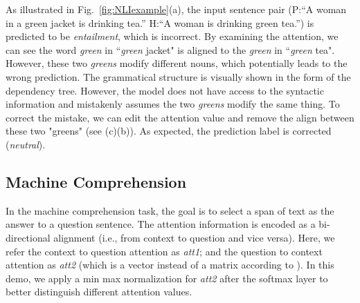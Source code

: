 As illustrated in Fig.~\ref{fig:NLIexample}(a), the input sentence pair (P:``A woman in a green jacket is drinking tea.'' H:``A woman is drinking green tea.'') is predicted to be \emph{entailment}, which is incorrect.
By examining the attention, we can see the word \emph{green} in ``\emph{green} jacket" is aligned to the \emph{green} in ``\emph{green} tea". However, these two \emph{greens} modify different nouns, which potentially leads to the wrong prediction. The grammatical structure is visually shown in the form of the dependency tree.
However, the model does not have access to the syntactic information and mistakenly assumes the two \emph{greens} modify the same thing.
%
To correct the mistake, we can edit the attention value and remove the align between these two "greens" (see (c)(b)).
As expected, the prediction label is corrected (\emph{neutral}).

\subsection{Machine Comprehension}
\label{sec:MCexample}
In the machine comprehension task, the goal is to select a span of text as the answer
to a question sentence.
The attention information is encoded as a bi-directional alignment (i.e., from context to question and vice versa). 
Here, we refer the context to question attention as \emph{att1}; and the question to context attention as \emph{att2} (which is a vector instead of a matrix according to \citet{Seo2016}). In this demo, we apply a min max normalization for \emph{att2} after the softmax layer to better distinguish different attention values.

